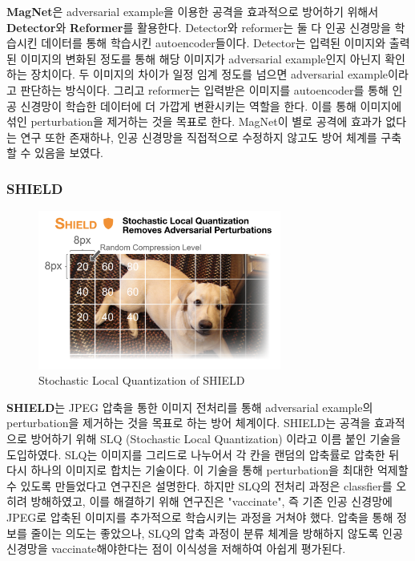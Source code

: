 \documentclass{article}
\begin{document}
\textbf{MagNet}은 adversarial example을 이용한 공격을 효과적으로 방어하기 위해서 \textbf{Detector}와 \textbf{Reformer}를 활용한다.\cite{carlini2017magnet} Detector와 reformer는 둘 다 인공 신경망을 학습시킨 데이터를 통해 학습시킨 autoencoder들이다. Detector는 입력된 이미지와 출력된 이미지의 변화된 정도를 통해 해당 이미지가 adversarial example인지 아닌지 확인하는 장치이다. 두 이미지의 차이가 일정 임계 정도를 넘으면 adversarial example이라고 판단하는 방식이다. 그리고 reformer는 입력받은 이미지를 autoencoder를 통해 인공 신경망이 학습한 데이터에 더 가깝게 변환시키는 역할을 한다. 이를 통해 이미지에 섞인 perturbation을 제거하는 것을 목표로 한다. MagNet이 별로 공격에 효과가 없다는 연구\cite{carlini2017magnet} 또한 존재하나, 인공 신경망을 직접적으로 수정하지 않고도 방어 체계를 구축할 수 있음을 보였다.

\subsubsection{SHIELD}

\begin{figure}[h]
    \centering
    \includegraphics[width=8cm]{images/shield-example.png}
    \caption{Stochastic Local Quantization of SHIELD \cite{das2018shield}}
\end{figure}

\textbf{SHIELD}는 JPEG 압축을 통한 이미지 전처리를 통해 adversarial example의 perturbation을 제거하는 것을 목표로 하는 방어 체계이다.\cite{das2018shield} SHIELD는 공격을 효과적으로 방어하기 위해 SLQ (Stochastic Local Quantization) 이라고 이름 붙인 기술을 도입하였다. SLQ는 이미지를 그리드로 나누어서 각 칸을 랜덤의 압축률로 압축한 뒤 다시 하나의 이미지로 합치는 기술이다. 이 기술을 통해 perturbation을 최대한 억제할 수 있도록 만들었다고 연구진은 설명한다. 하지만 SLQ의 전처리 과정은 classfier를 오히려 방해하였고, 이를 해결하기 위해 연구진은 "vaccinate", 즉 기존 인공 신경망에 JPEG로 압축된 이미지를 추가적으로 학습시키는 과정을 거쳐야 했다. 압축을 통해 정보를 줄이는 의도는 좋았으나, SLQ의 압축 과정이 분류 체계을 방해하지 않도록 인공 신경망을 vaccinate해야한다는 점이 이식성을 저해하여 아쉽게 평가된다.
\end{document}

